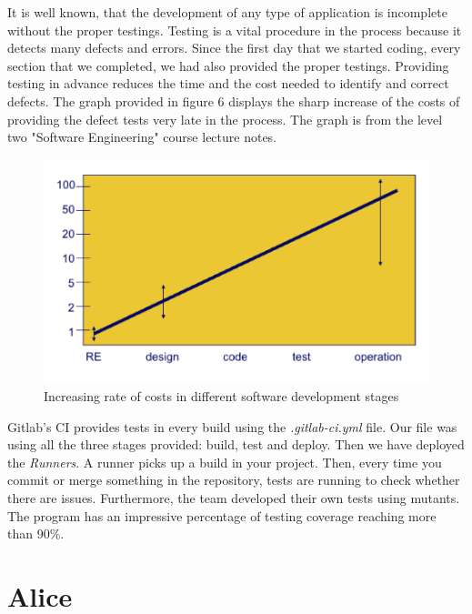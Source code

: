 \documentclass{l3proj}
\begin{document}
It is well known, that the development of any type of application is incomplete without the proper testings. Testing is a vital procedure in the process because it detects many defects and errors. Since the first day that we started coding, every section that we completed, we had also provided the proper testings. Providing testing in advance reduces the time and the cost needed to identify and correct defects. The graph provided in figure 6 displays the sharp increase of the costs of providing the defect tests very late in the process. The graph is from the level two "Software Engineering" course lecture notes.

\begin{figure}
  \centerline{\includegraphics[width=\textwidth, height=\textheight, keepaspectratio]{costOfErrors.png}}
  \caption{Increasing rate of costs in different software development stages }
\end{figure}

 Gitlab's CI provides tests in every build using the \textit{.gitlab-ci.yml} file. Our file was using all the three stages provided: build, test and deploy. Then we have deployed the \textit{Runners}. A runner picks up a build in your project. Then, every time you commit or merge something in the repository, tests are running to check whether there are issues. Furthermore, the team developed their own tests using mutants. The program has an impressive percentage of testing coverage reaching more than 90\%. 






\section{Alice}
\label{sec:alice}
\end{document}
